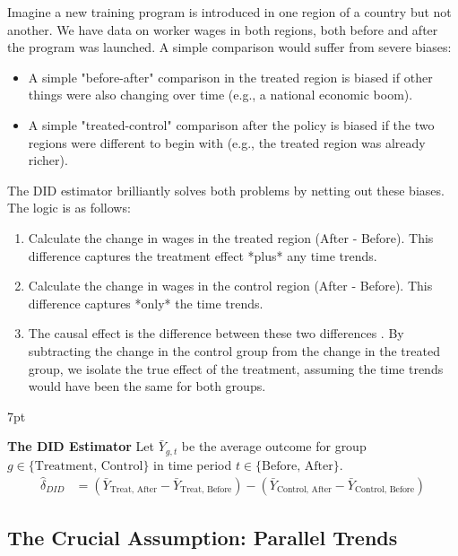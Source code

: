 \documentclass{article}
\providecommand{\tightlist}{
  \setlength{\itemsep}{0pt}
  \setlength{\parskip}{0pt}}
\newenvironment{greenblock}{%
\def\FrameCommand{%
  \hspace{1pt}%
    {\color{Green}%
    \vrule width 2pt}%
    {\color{greenshade}%
    \vrule width 4pt}%
  \colorbox{greenshade}%
}%
\MakeFramed{%
  \advance%
  \hsize-%
  \width%
  \FrameRestore}%
\noindent\hspace{-4.55pt}%
\begin{adjustwidth}{}{7pt}%
\vspace{2pt}\vspace{2pt}%
}
{%
\vspace{2pt}\end{adjustwidth}\endMakeFramed%
}
\begin{document}
Imagine a new training program is introduced in one region of a country but not another. We have data on worker wages in both regions, both before and after the program was launched. A simple comparison would suffer from severe biases:
\begin{itemize}
    \tightlist
    \item A simple "before-after" comparison in the treated region is biased if other things were also changing over time (e.g., a national economic boom).
    \item A simple "treated-control" comparison after the policy is biased if the two regions were different to begin with (e.g., the treated region was already richer).
\end{itemize}

The DID estimator brilliantly solves both problems by netting out these biases. The logic is as follows:
\begin{enumerate}
    \item Calculate the change in wages in the treated region (After - Before). This difference captures the treatment effect *plus* any time trends.
    \item Calculate the change in wages in the control region (After - Before). This difference captures *only* the time trends.
    \item The causal effect is the 
difference between these two differences
. By subtracting the change in the control group from the change in the treated group, we isolate the true effect of the treatment, assuming the time trends would have been the same for both groups.
\end{enumerate}

\begin{greenblock}
\textbf{The DID Estimator}
Let $\bar{Y}_{g,t}$ be the average outcome for group $g \in \{\text{Treatment, Control}\}$ in time period $t \in \{\text{Before, After}\}$.
\begin{equation}
\begin{split}
\hat{\delta}_{DID} &= (\bar{Y}_{\text{Treat, After}} - \bar{Y}_{\text{Treat, Before}}) - (\bar{Y}_{\text{Control, After}} - \bar{Y}_{\text{Control, Before}})
\end{split}
\end{equation}
\end{greenblock}

\subsection{The Crucial Assumption: Parallel Trends}
\label{sub:parallel_trends}
\end{document}
